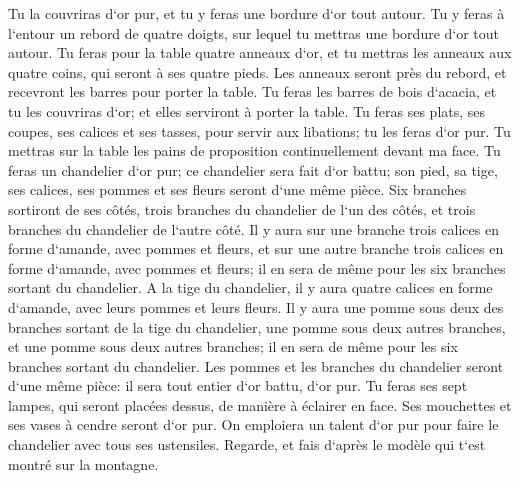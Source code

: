 \verse Tu la couvriras d`or pur, et tu y feras une bordure d`or tout autour. 
\verse Tu y feras à l`entour un rebord de quatre doigts, sur lequel tu mettras une bordure d`or tout autour. 
\verse Tu feras pour la table quatre anneaux d`or, et tu mettras les anneaux aux quatre coins, qui seront à ses quatre pieds. 
\verse Les anneaux seront près du rebord, et recevront les barres pour porter la table. 
\verse Tu feras les barres de bois d`acacia, et tu les couvriras d`or; et elles serviront à porter la table. 
\verse Tu feras ses plats, ses coupes, ses calices et ses tasses, pour servir aux libations; tu les feras d`or pur. 
\verse Tu mettras sur la table les pains de proposition continuellement devant ma face. 
\verse Tu feras un chandelier d`or pur; ce chandelier sera fait d`or battu; son pied, sa tige, ses calices, ses pommes et ses fleurs seront d`une même pièce. 
\verse Six branches sortiront de ses côtés, trois branches du chandelier de l`un des côtés, et trois branches du chandelier de l`autre côté. 
\verse Il y aura sur une branche trois calices en forme d`amande, avec pommes et fleurs, et sur une autre branche trois calices en forme d`amande, avec pommes et fleurs; il en sera de même pour les six branches sortant du chandelier. 
\verse A la tige du chandelier, il y aura quatre calices en forme d`amande, avec leurs pommes et leurs fleurs. 
\verse Il y aura une pomme sous deux des branches sortant de la tige du chandelier, une pomme sous deux autres branches, et une pomme sous deux autres branches; il en sera de même pour les six branches sortant du chandelier. 
\verse Les pommes et les branches du chandelier seront d`une même pièce: il sera tout entier d`or battu, d`or pur. 
\verse Tu feras ses sept lampes, qui seront placées dessus, de manière à éclairer en face. 
\verse Ses mouchettes et ses vases à cendre seront d`or pur. 
\verse On emploiera un talent d`or pur pour faire le chandelier avec tous ses ustensiles. 
\verse Regarde, et fais d`après le modèle qui t`est montré sur la montagne. 

\chapter{}

